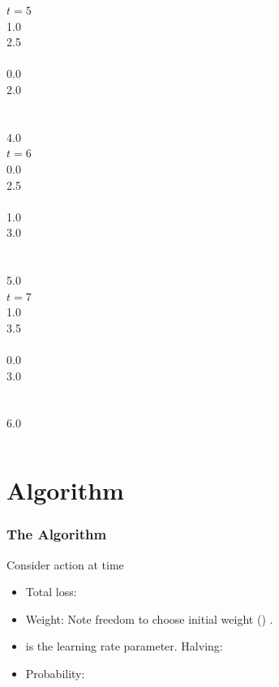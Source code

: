 \documentclass{beamer}
\begin{document}
\begin{frame}
\begin{columns}
\column[t]{1cm}
 $t=5$ \\ 1.0 \\ 2.5 \\~\\ 0.0 \\ 2.0 \\~\\~\\4.0\\
		    			     
\column[t]{1cm}	   		   
 $t=6$   \\ 0.0 \\ 2.5 \\~\\ 1.0  \\ 3.0 \\~\\~\\5.0\\

\column[t]{1cm}
 $t=7$ \\ 1.0 \\ 3.5 \\~\\ 0.0 \\ 3.0 \\~\\~\\6.0\\
		    			     

\end{columns} 
\end{frame}


\section{\ouralg Algorithm}

\begin{frame}
\frametitle{The \ouralg Algorithm}
Consider action  at time 
\begin{itemize}
\item Total loss:
\item Weight:
Note freedom to choose initial weight ()
.
\item
{} is the learning rate parameter. Halving: \R{$\eta \to \infty$}
\item Probability:
\end{itemize}
\end{frame}
\end{document}
